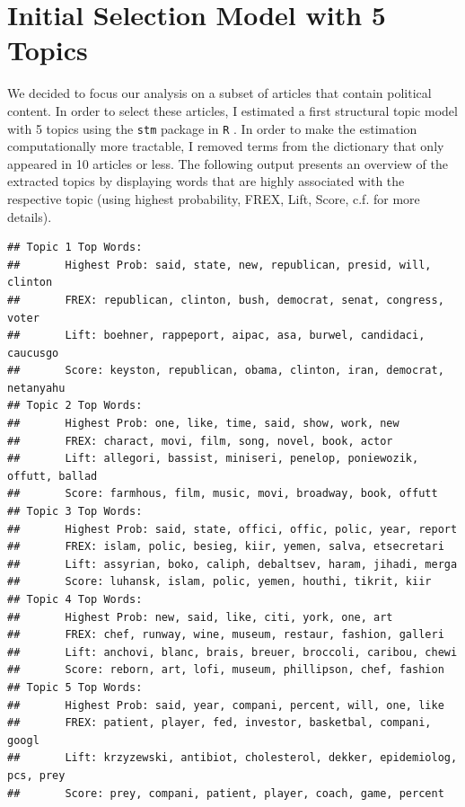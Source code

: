 \documentclass[12pt]{article}\usepackage[]{graphicx}\usepackage[]{color}
\makeatletter
\newenvironment{kframe}{%
 \def\at@end@of@kframe{}%
 \ifinner\ifhmode%
  \def\at@end@of@kframe{\end{minipage}}%
  \begin{minipage}{\columnwidth}%
 \fi\fi%
 \def\FrameCommand##1{\hskip\@totalleftmargin \hskip-\fboxsep
 \colorbox{shadecolor}{##1}\hskip-\fboxsep
     \hskip-\linewidth \hskip-\@totalleftmargin \hskip\columnwidth}%
 \MakeFramed {\advance\hsize-\width
   \@totalleftmargin\z@ \linewidth\hsize
   \@setminipage}}%
 {\par\unskip\endMakeFramed%
 \at@end@of@kframe}
\newenvironment{knitrout}{}{} %
\makeatother
\begin{document}
\section{Initial Selection Model with 5 Topics}

We decided to focus our analysis on a subset of articles that contain political content. In order to select these articles, I estimated a first structural topic model with 5 topics using the \texttt{stm} package in \texttt{R} \citep[using spectral initialization, see][]{roberts2014structural,roberts2014stm}. In order to make the estimation computationally more tractable, I removed terms from the dictionary that only appeared in 10 articles or less. The following output presents an overview of the extracted topics by displaying words that are highly associated with the respective topic (using highest probability, FREX, Lift, Score, c.f. \citealt{roberts2014stm} for more details).

\begin{knitrout}
\color{fgcolor}\begin{kframe}
\begin{verbatim}
## Topic 1 Top Words:
##  	 Highest Prob: said, state, new, republican, presid, will, clinton 
##  	 FREX: republican, clinton, bush, democrat, senat, congress, voter 
##  	 Lift: boehner, rappeport, aipac, asa, burwel, candidaci, caucusgo 
##  	 Score: keyston, republican, obama, clinton, iran, democrat, netanyahu 
## Topic 2 Top Words:
##  	 Highest Prob: one, like, time, said, show, work, new 
##  	 FREX: charact, movi, film, song, novel, book, actor 
##  	 Lift: allegori, bassist, miniseri, penelop, poniewozik, offutt, ballad 
##  	 Score: farmhous, film, music, movi, broadway, book, offutt 
## Topic 3 Top Words:
##  	 Highest Prob: said, state, offici, offic, polic, year, report 
##  	 FREX: islam, polic, besieg, kiir, yemen, salva, etsecretari 
##  	 Lift: assyrian, boko, caliph, debaltsev, haram, jihadi, merga 
##  	 Score: luhansk, islam, polic, yemen, houthi, tikrit, kiir 
## Topic 4 Top Words:
##  	 Highest Prob: new, said, like, citi, york, one, art 
##  	 FREX: chef, runway, wine, museum, restaur, fashion, galleri 
##  	 Lift: anchovi, blanc, brais, breuer, broccoli, caribou, chewi 
##  	 Score: reborn, art, lofi, museum, phillipson, chef, fashion 
## Topic 5 Top Words:
##  	 Highest Prob: said, year, compani, percent, will, one, like 
##  	 FREX: patient, player, fed, investor, basketbal, compani, googl 
##  	 Lift: krzyzewski, antibiot, cholesterol, dekker, epidemiolog, pcs, prey 
##  	 Score: prey, compani, patient, player, coach, game, percent
\end{verbatim}
\end{kframe}
\end{knitrout}
\end{document}
